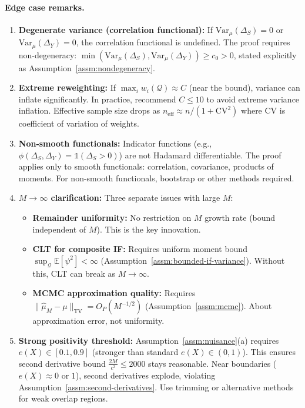 \paragraph{Edge case remarks.}
\begin{enumerate}
\item \textbf{Degenerate variance (correlation functional):} If $\text{Var}_\mu(\Delta_S) = 0$ or $\text{Var}_\mu(\Delta_Y) = 0$, the correlation functional is undefined. The proof requires non-degeneracy: $\min(\text{Var}_\mu(\Delta_S), \text{Var}_\mu(\Delta_Y)) \geq c_0 > 0$, stated explicitly as Assumption~\ref{assm:nondegeneracy}.

\item \textbf{Extreme reweighting:} If $\max_i w_i(\mathcal{Q}) \approx C$ (near the bound), variance can inflate significantly. In practice, recommend $C \leq 10$ to avoid extreme variance inflation. Effective sample size drops as $n_{\text{eff}} \approx n / (1 + \text{CV}^2)$ where $\text{CV}$ is coefficient of variation of weights.

\item \textbf{Non-smooth functionals:} Indicator functions (e.g., $\phi(\Delta_S, \Delta_Y) = \mathbb{1}(\Delta_S > 0)$) are not Hadamard differentiable. The proof applies only to smooth functionals: correlation, covariance, products of moments. For non-smooth functionals, bootstrap or other methods required.

\item \textbf{$M \to \infty$ clarification:} Three separate issues with large $M$:
\begin{itemize}
\item \textbf{Remainder uniformity:} No restriction on $M$ growth rate (bound independent of $M$). This is the key innovation.
\item \textbf{CLT for composite IF:} Requires uniform moment bound $\sup_{\mathcal{Q}} \mathbb{E}[\psi^2] < \infty$ (Assumption~\ref{assm:bounded-if-variance}). Without this, CLT can break as $M \to \infty$.
\item \textbf{MCMC approximation quality:} Requires $\|\hat{\mu}_M - \mu\|_{\text{TV}} = O_P(M^{-1/2})$ (Assumption~\ref{assm:mcmc}). About approximation error, not uniformity.
\end{itemize}

\item \textbf{Strong positivity threshold:} Assumption~\ref{assm:nuisance}(a) requires $e(X) \in [0.1, 0.9]$ (stronger than standard $e(X) \in (0, 1)$). This ensures second derivative bound $\frac{2M}{c^3} \leq 2000$ stays reasonable. Near boundaries ($e(X) \approx 0$ or $1$), second derivatives explode, violating Assumption~\ref{assm:second-derivatives}. Use trimming or alternative methods for weak overlap regions.
\end{enumerate}

